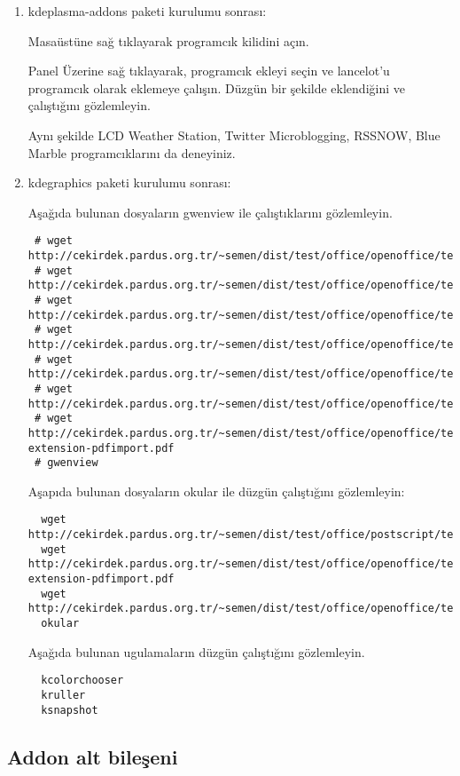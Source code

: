 \documentclass[a4paper,10pt]{article}
\begin{document}
\begin{enumerate}
\item kdeplasma-addons paketi kurulumu sonrası:

Masaüstüne sağ tıklayarak programcık kilidini açın.

Panel Üzerine sağ tıklayarak, programcık ekleyi seçin ve lancelot'u programcık olarak eklemeye çalışın. Düzgün bir şekilde eklendiğini ve çalıştığını gözlemleyin.

Aynı şekilde LCD Weather Station, Twitter Microblogging, RSSNOW, Blue Marble programcıklarını da deneyiniz.

\item kdegraphics paketi kurulumu sonrası:

Aşağıda bulunan dosyaların gwenview  ile çalıştıklarını gözlemleyin.  
\begin{verbatim} 
 # wget http://cekirdek.pardus.org.tr/~semen/dist/test/office/openoffice/test_oodraw.jpg
 # wget http://cekirdek.pardus.org.tr/~semen/dist/test/office/openoffice/test_oodraw.mng
 # wget http://cekirdek.pardus.org.tr/~semen/dist/test/office/openoffice/test_oodraw.png
 # wget http://cekirdek.pardus.org.tr/~semen/dist/test/office/openoffice/test_oodraw.ps
 # wget http://cekirdek.pardus.org.tr/~semen/dist/test/office/openoffice/test_oodraw.tif
 # wget http://cekirdek.pardus.org.tr/~semen/dist/test/office/openoffice/test_oodraw.xcf
 # wget http://cekirdek.pardus.org.tr/~semen/dist/test/office/openoffice/test_openoffice-extension-pdfimport.pdf
 # gwenview
\end{verbatim}
Aşapıda bulunan dosyaların okular ile düzgün çalıştığını gözlemleyin:
\begin{verbatim} 
  wget http://cekirdek.pardus.org.tr/~semen/dist/test/office/postscript/test_ghostscript.dvi
  wget http://cekirdek.pardus.org.tr/~semen/dist/test/office/openoffice/test_openoffice-extension-pdfimport.pdf
  wget http://cekirdek.pardus.org.tr/~semen/dist/test/office/openoffice/test_oodraw.ps
  okular
 \end{verbatim}

Aşağıda bulunan ugulamaların düzgün çalıştığını gözlemleyin.
\begin{verbatim}
  kcolorchooser
  kruller
  ksnapshot
\end{verbatim}


\end{enumerate}

\subsection*{Addon alt bileşeni}
\end{document}
